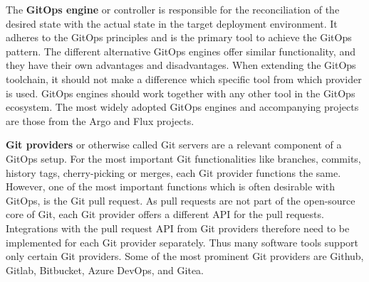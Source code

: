 

The \textbf{GitOps engine} or controller is responsible for the
reconciliation of the desired state with the actual state
in the target deployment environment.
It adheres to the GitOps principles and is the primary tool
to achieve the GitOps pattern.
The different alternative GitOps engines offer similar functionality,
and they have their own advantages and disadvantages.
When extending the GitOps toolchain, it should not make a difference which specific
tool from which provider is used.
GitOps engines should work together with any other tool in the GitOps ecosystem.
The most widely adopted GitOps engines and accompanying projects are those from
the Argo
\autocite{argoProjWebsite}
and Flux
\autocite{fluxWebsite}
projects.









\textbf{Git providers} or otherwise called Git servers are a relevant component of
a GitOps setup.
For the most important Git functionalities like branches, commits, history
tags, cherry-picking or merges, each Git provider functions the same.
However, one of the most important functions which is often desirable with GitOps, is the Git pull request.
As pull requests are not part of the open-source core of Git,
each Git provider offers a different API for the pull requests.
Integrations with the pull request API from Git providers therefore need to be implemented
for each Git provider separately. Thus many software tools support only certain Git providers.
Some of the most prominent Git providers are
Github,
Gitlab,
Bitbucket,
Azure DevOps, and
Gitea.






















